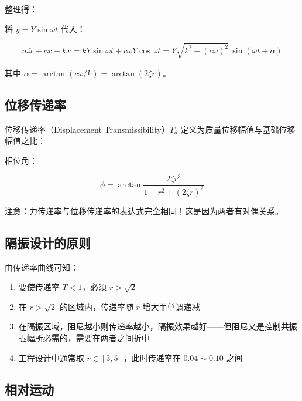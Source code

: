 整理得：
\begin{myformula}
    \end{myformula}

将 $y = Y\sin\omega t$ 代入：
\begin{myformula}
    \[
    m\ddot{x} + c\dot{x} + kx = kY\sin\omega t + c\omega Y\cos\omega t
                              = Y\sqrt{k^2 + (c\omega)^2}\,\sin(\omega t + \alpha)
    \]
\end{myformula}
其中 $\alpha = \arctan(c\omega/k) = \arctan(2\zeta r)$。

\subsection{位移传递率}

位移传递率（Displacement Transmissibility）$T_d$ 定义为质量位移幅值与基础位移幅值之比：
\begin{myformula}
    \end{myformula}

相位角：
\begin{myformula}
    \[
    \phi = \arctan\frac{2\zeta r^3}{1 - r^2 + (2\zeta r)^2}
    \]
\end{myformula}

注意：力传递率与位移传递率的表达式完全相同！这是因为两者有对偶关系。

\subsection{隔振设计的原则}

由传递率曲线可知：
\begin{enumerate}
    \item 要使传递率 $T < 1$，必须 $r > \sqrt{2}$
    \item 在 $r > \sqrt{2}$ 的区域内，传递率随 $r$ 增大而单调递减
    \item 在隔振区域，阻尼越小则传递率越小，隔振效果越好——但阻尼又是控制共振振幅所必需的，需要在两者之间折中
    \item 工程设计中通常取 $r \in [3, 5]$，此时传递率在 $0.04 \sim 0.10$ 之间
\end{enumerate}

\subsection{相对运动}

